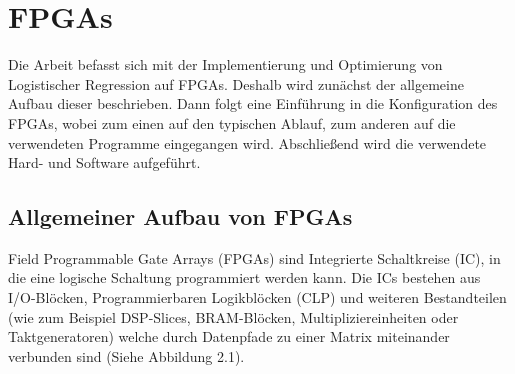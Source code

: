 \chapter{FPGAs}
Die Arbeit befasst sich mit der Implementierung und Optimierung von Logistischer Regression auf FPGAs. Deshalb wird zunächst der allgemeine Aufbau dieser beschrieben. Dann folgt eine Einführung in die Konfiguration des FPGAs, wobei zum einen auf den typischen Ablauf, zum anderen auf die verwendeten Programme eingegangen wird. Abschließend wird die verwendete Hard- und Software aufgeführt.
\section{Allgemeiner Aufbau von FPGAs}
Field Programmable Gate Arrays (FPGAs) sind Integrierte Schaltkreise (IC), in die eine logische Schaltung programmiert werden kann. Die ICs bestehen aus I/O-Blöcken, Programmierbaren Logikblöcken (CLP) und weiteren Bestandteilen (wie zum Beispiel DSP-Slices, BRAM-Blöcken, Multipliziereinheiten oder Taktgeneratoren) welche durch Datenpfade zu einer Matrix miteinander verbunden sind (Siehe Abbildung 2.1).\\
